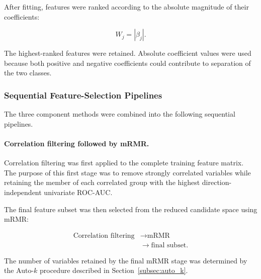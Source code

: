 \documentclass[12pt,twocolumn]{article}
\begin{document}
After fitting, features were ranked according to the absolute
magnitude of their coefficients:

\begin{equation}
W_j = |\beta_j|.
\label{eq:elasticnet_feature_weight}
\end{equation}

The highest-ranked features were retained. Absolute coefficient
values were used because both positive and negative coefficients
could contribute to separation of the two classes.









\subsubsection{Sequential Feature-Selection Pipelines}
\label{subsubsec:sequential_fs_pipelines}

The three component methods were combined into the following
sequential pipelines.

\paragraph{Correlation filtering followed by mRMR.}

Correlation filtering was first applied to the complete training
feature matrix. The purpose of this first stage was to remove strongly
correlated variables while retaining the member of each correlated
group with the highest direction-independent univariate ROC-AUC.

The final feature subset was then selected from the reduced candidate
space using mRMR:

\begin{equation}
\begin{aligned}
\text{Correlation filtering}
&\longrightarrow
\text{mRMR}\\
&\longrightarrow
\text{final subset}.
\end{aligned}
\label{eq:corr_mrmr_pipeline}
\end{equation}

The number of variables retained by the final mRMR stage was determined
by the Auto-\(k\) procedure described in
Section~\ref{subsec:auto_k}.
\end{document}

